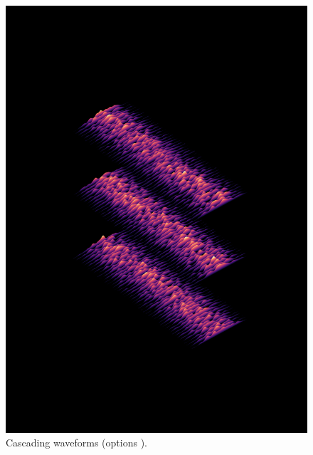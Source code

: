 \documentclass[minted, draw, cover = contour]{../tex/hebdomon}
\begin{document}
\begin{figure}[!h]
	\centering
	\includegraphics[width=0.6\pagewidth]{../coverArts/SpectrumWaves.pdf}
	\caption{Cascading waveforms (options ).}
\end{figure}

\newpage
\end{document}
